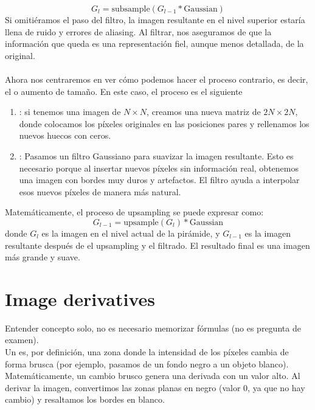$$G_l = \text{subsample}(G_{l-1} * \text{Gaussian})$$
Si omitiéramos el paso del filtro, la imagen resultante en el nivel superior estaría llena de ruido y errores de aliasing. Al filtrar, nos aseguramos de que la información que queda es una representación fiel, aunque menos detallada, de la original. \\ \\

\noindent
Ahora nos centraremos en ver cómo podemos hacer el proceso contrario, es decir, el  o aumento de tamaño. En este caso, el proceso es el siguiente
\begin{enumerate}
    \item {}: si tenemos una imagen de $N \times N$, creamos una nueva matriz de $2N \times 2N$, donde colocamos los píxeles originales en las posiciones pares y rellenamos los nuevos huecos con ceros.
    \item {}: Pasamos un filtro Gaussiano para suavizar la imagen resultante. Esto es necesario porque al insertar nuevos píxeles sin información real, obtenemos una imagen con bordes muy duros y artefactos. El filtro ayuda a interpolar esos nuevos píxeles de manera más natural.
\end{enumerate}
Matemáticamente, el proceso de upsampling se puede expresar como:
$$G_{l-1} = \text{upsample}(G_l) * \text{Gaussian}$$
donde $G_l$ es la imagen en el nivel actual de la pirámide, y $G_{l-1}$ es la imagen resultante después de el upsampling y el filtrado. El resultado final es una imagen más grande y suave.

\section{Image derivatives}
\noindent 
Entender concepto solo, no es necesario memorizar fórmulas (no es pregunta de examen). \\

\noindent
Un  es, por definición, una zona donde la intensidad de los píxeles cambia de forma brusca (por ejemplo, pasamos de un fondo negro a un objeto blanco). Matemáticamente, un cambio brusco genera una derivada con un valor alto. Al derivar la imagen, convertimos las zonas planas en negro (valor 0, ya que no hay cambio) y resaltamos los bordes en blanco. \\ 

